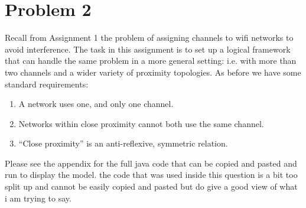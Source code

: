 \documentclass{article}
\begin{document}
\section{Problem 2}
Recall from Assignment 1 the problem of assigning channels to wifi networks to avoid interference. The
task in this assignment is to set up a logical framework that can handle the same problem in a more
general setting: i.e. with more than two channels and a wider variety of proximity topologies. As before we have some standard requirements:
    \begin{enumerate}[I]
        \item A network uses one, and only one channel.
        \item Networks within close proximity cannot both use the same channel.
        \item “Close proximity” is an anti-reflexive, symmetric relation.
    \end{enumerate}
Please see the appendix for the full java code that can be copied and pasted and run to display the model. the code that was used inside this question is a bit too split up and cannot be easily copied and pasted but do give a good view of what i am trying to say.
\end{document}
